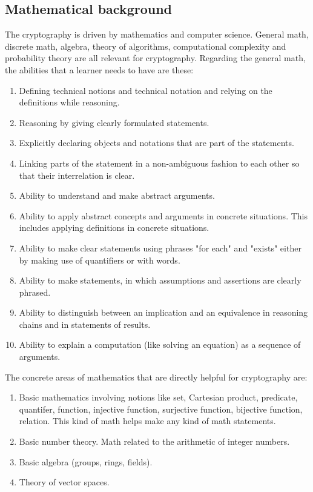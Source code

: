 \documentclass[11pt]{article}
\theoremstyle{plain}
\theoremstyle{definition}
\begin{document}
\subsection{Mathematical background}

The cryptography is driven by mathematics and computer science. General math, discrete math, algebra, theory of algorithms, computational complexity and probability theory are all relevant for cryptography. Regarding the general math, the abilities that a learner needs to have are these: 
\begin{enumerate} 
	\item Defining technical notions and technical notation and relying on the definitions while reasoning. 
	\item Reasoning by giving clearly formulated statements. 
	\item Explicitly declaring objects and notations that are part of the statements. 
	\item Linking parts of the statement in a non-ambiguous fashion to each other so that their interrelation is clear. 
	\item Ability to understand and  make abstract arguments. 
	\item Ability to apply abstract concepts and arguments in concrete situations. This includes applying definitions in concrete situations. 
	\item Ability to make clear statements using phrases "for each" and "exists" either by making use of quantifiers or with words. 
	\item Ability to make statements, in which assumptions and assertions are clearly phrased. 
	\item Ability to distinguish between an implication and an equivalence in reasoning chains and in statements of results. 
	\item Ability to explain a computation (like solving an equation) as a sequence of arguments. 
\end{enumerate} 

The concrete areas of mathematics that are directly helpful for cryptography are: 
\begin{enumerate} 
	\item Basic mathematics involving notions like set, Cartesian product, predicate, quantifer, function, injective function, surjective function, bijective function, relation. This kind of math helps make any kind of math statements. 
	\item Basic number theory. Math related to the arithmetic of integer numbers. 
	\item Basic algebra (groups, rings, fields). 
	\item Theory of vector spaces. 
\end{enumerate} 
\end{document}

